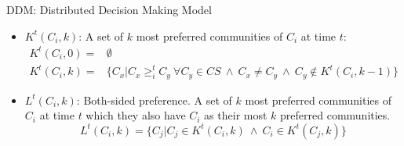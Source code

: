 \documentclass{beamer}
\begin{document}
\begin{frame}{DDM: Distributed Decision Making Model}
    \footnotesize
    \begin{itemize}
        \item {\color{blue}$K^t(C_i, k)$:} A set of $k$ most preferred communities of $C_i$ at time $t$:
            \footnotesize
            \begin{equation*}\label{h_t_pref_top}
                \begin{split}				
                    K^t(C_i, 0) = &\emptyset \\
                    K^t(C_i, k) = &\Big\{C_x | C_x \geq_{i}^t C_y ~\forall C_y \in CS ~\wedge~ C_x \neq C_y ~\wedge~ C_y \notin K^t(C_i, k-1) \Big\}				
                \end{split}
            \end{equation*}
        \item {\color{blue}$L^t(C_i,k)$:} Both-sided preference. A set of $k$ most preferred communities of $C_i$ at time $t$ which they also have $C_i$ as their most $k$ preferred communities.
            \footnotesize
            \begin{equation*}\label{l_t_top_both}
                L^t(C_i,k) = \Big\{C_j | C_j \in K^t(C_i, k)~ \wedge~ C_i \in K^t(C_j, k)\Big\}
            \end{equation*}
    \end{itemize}
\end{frame}
\end{document}
